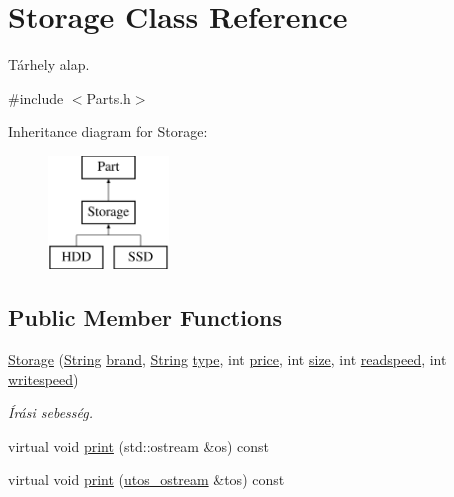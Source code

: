 \hypertarget{class_storage}{}\section{Storage Class Reference}
\label{class_storage}


Tárhely alap.  




{\ttfamily \#include $<$Parts.\+h$>$}

Inheritance diagram for Storage\+:\begin{figure}[H]
\begin{center}
\leavevmode
\includegraphics[height=3.000000cm]{class_storage}
\end{center}
\end{figure}
\subsection*{Public Member Functions}
\begin{DoxyCompactItemize}
\item 
\mbox{\hyperlink{class_storage_a502a2ec76e09d48a87da6ed1b91cdaa8}{Storage}} (\mbox{\hyperlink{class_string}{String}} \mbox{\hyperlink{class_part_ae06f2fdeb7fbbdb229a7aca151f3e341}{brand}}, \mbox{\hyperlink{class_string}{String}} \mbox{\hyperlink{class_part_a101dbcc5c4b21564df7414c7eb0eae88}{type}}, int \mbox{\hyperlink{class_part_a8e71223aed1da95a974f33d8d6c91bb1}{price}}, int \mbox{\hyperlink{class_storage_abcc80ce58a21fa884035617ee0b6cb67}{size}}, int \mbox{\hyperlink{class_storage_a41073842ff16961dad3903e6dd49bb0c}{readspeed}}, int \mbox{\hyperlink{class_storage_a0198a1483ccf849d48c76da88599ba8b}{writespeed}})
\begin{DoxyCompactList}\small\item\em Írási sebesség. \end{DoxyCompactList}\item 
virtual void \mbox{\hyperlink{class_storage_aa9f6ffb0fd45839b54bd4e254270445d}{print}} (std\+::ostream \&os) const
\item 
virtual void \mbox{\hyperlink{class_storage_ab7ecf9e0777891b4e1a84bbf391a1cd4}{print}} (\mbox{\hyperlink{structutos__ostream}{utos\+\_\+ostream}} \&tos) const
\end{DoxyCompactItemize}
